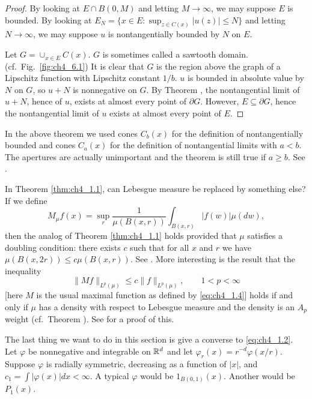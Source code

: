 \begin{proof}
By looking at $E \cap B(0,M)$ and letting $M \to \infty$, we may suppose $E$ is bounded. By looking at $E_N = \{x \in E : \sup_{z\in C(x)} |u(z)| \leq N\}$ and letting $N \to \infty$, we may suppose $u$ is nontangentially bounded by $N$ on $E$.

Let $G = \cup_{x\in E}C(x)$. $G$ is sometimes called a sawtooth domain. (cf.\ Fig.\ \ref{fig:ch4_6.1}) It is clear that $G$ is the region above the graph of a Lipschitz function with Lipschitz constant $1/b$. $u$ is bounded in absolute value by $N$ on $G$, so $u + N$ is nonnegative on $G$. By Theorem , the nontangential limit of $u + N$, hence of $u$, exists at almost every point of $\partial G$. However, $E \subseteq \partial G$, hence the nontangential limit of $u$ exists at almost every point of $E$.
\end{proof}

In the above theorem we used cones $C_b(x)$ for the definition of nontangentially bounded and cones $C_a(x)$ for the definition of nontangential limits with $a < b$. The apertures are actually unimportant and the theorem is still true if $a \geq b$. See \cite{Durrett1984}.

In Theorem \ref{thm:ch4_1.1}, can Lebesgue measure be replaced by something else? If we define
\[
    M_\mu f(x) = \sup_r \frac{1}{\mu(B(x,r))} \int_{B(x,r)} |f(w)|\mu(dw),
\]
then the analog of Theorem \ref{thm:ch4_1.1} holds provided that $\mu$ satisfies a doubling condition: there exists $c$ such that for all $x$ and $r$ we have $\mu(B(x,2r)) \leq c\mu(B(x,r))$. See \cite{Garnett1981}. More interesting is the result that the inequality
\[
    \|Mf\|_{L^p(\mu)} \leq c\|f\|_{L^p(\mu)}, \qquad 1 < p < \infty
\]
[here $M$ is the usual maximal function as defined by \eqref{eq:ch4_1.4}] holds if and only if $\mu$ has a density with respect to Lebesgue measure and the density is an $A_p$ weight (cf.\ Theorem ). See \cite{Garnett1981} for a proof of this.


The last thing we want to do in this section is give a converse to \eqref{eq:ch4_1.2}. Let $\varphi$ be nonnegative and integrable on $\mathbb{R}^d$ and let $\varphi_r(x) = r^{-d}\varphi(x/r)$. Suppose $\varphi$ is radially symmetric, decreasing as a function of $|x|$, and $c_1 = \int |\varphi(x)|dx < \infty$. A typical $\varphi$ would be $1_{B(0,1)}(x)$. Another would be $P_1(x)$.

